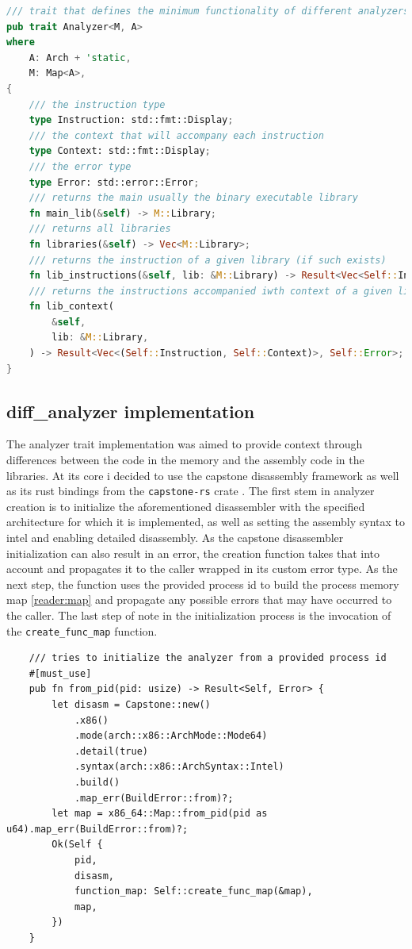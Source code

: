 \begin{lstlisting}[caption=\label{lst:analyzer}"The analyzer trait", language=Rust]
    /// trait that defines the minimum functionality of different analyzers
pub trait Analyzer<M, A>
where
    A: Arch + 'static,
    M: Map<A>,
{
    /// the instruction type
    type Instruction: std::fmt::Display;
    /// the context that will accompany each instruction
    type Context: std::fmt::Display;
    /// the error type
    type Error: std::error::Error;
    /// returns the main usually the binary executable library
    fn main_lib(&self) -> M::Library;
    /// returns all libraries
    fn libraries(&self) -> Vec<M::Library>;
    /// returns the instruction of a given library (if such exists)
    fn lib_instructions(&self, lib: &M::Library) -> Result<Vec<Self::Instruction>, Self::Error>;
    /// returns the instructions accompanied iwth context of a given library
    fn lib_context(
        &self,
        lib: &M::Library,
    ) -> Result<Vec<(Self::Instruction, Self::Context)>, Self::Error>;
}
\end{lstlisting}

\subsection{diff\_analyzer implementation}

The analyzer trait implementation was aimed to provide context through differences between the code in the memory and the assembly code in the libraries.
At its core i decided to use the capstone \cite{capstone-engine_team_capstone-enginecapstone_2022} disassembly framework as well as its rust bindings from the \verb|capstone-rs| crate \cite{finkenauer_capstone-rustcapstone-rs_nodate}.
The first stem in analyzer creation is to initialize the aforementioned disassembler with the specified architecture for which it is implemented, as well as setting the assembly syntax to intel and enabling detailed disassembly.
As the capstone disassembler initialization can also result in an error, the creation function takes that into account and propagates it to the caller wrapped in its custom error type.
As the next step, the function uses the provided process id to build the process memory map \autoref{reader:map} and propagate any possible errors that may have occurred to the caller.
The last step of note in the initialization process is the invocation of the \verb|create_func_map| function.

\begin{lstlisting}
    /// tries to initialize the analyzer from a provided process id
    #[must_use]
    pub fn from_pid(pid: usize) -> Result<Self, Error> {
        let disasm = Capstone::new()
            .x86()
            .mode(arch::x86::ArchMode::Mode64)
            .detail(true)
            .syntax(arch::x86::ArchSyntax::Intel)
            .build()
            .map_err(BuildError::from)?;
        let map = x86_64::Map::from_pid(pid as u64).map_err(BuildError::from)?;
        Ok(Self {
            pid,
            disasm,
            function_map: Self::create_func_map(&map),
            map,
        })
    }
\end{lstlisting}


